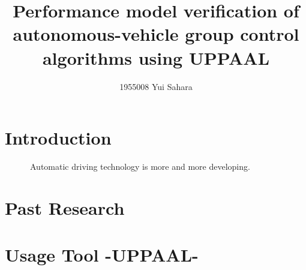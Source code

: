 \documentclass[]{article}
\begin{document}
\title{Performance model verification of autonomous-vehicle group control algorithms using UPPAAL }
\author{1955008	Yui Sahara}
\date{}

\maketitle

\section{Introduction}
　　　Automatic driving technology is more and more developing.  
\section{Past Research}
\section{Usage Tool -UPPAAL-}
\end{document}
